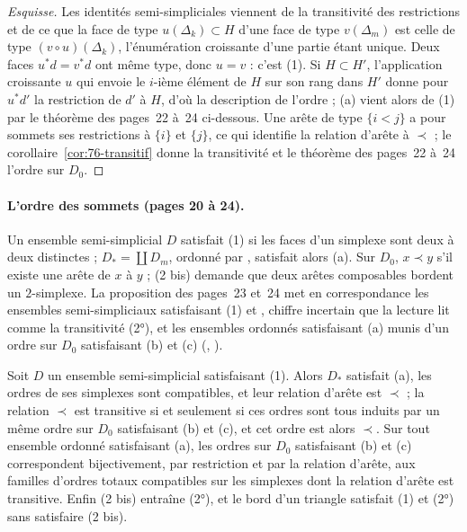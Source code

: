 \begin{proof}[Esquisse]
Les identités semi-simpliciales viennent de la transitivité des restrictions et de ce que la face de type $u(\Delta_k) \subset H$ d'une face de type $v(\Delta_m)$ est celle de type $(v \circ u)(\Delta_k)$, l'énumération croissante d'une partie étant unique. Deux faces $u^*d = v^*d$ ont même type, donc $u = v$ : c'est (1). Si $H \subset H'$, l'application croissante $u$ qui envoie le $i$-ième élément de $H$ sur son rang dans $H'$ donne pour $u^*d'$ la restriction de $d'$ à $H$, d'où la description de l'ordre ; (a) vient alors de (1) par le théorème des pages~22 à~24 ci-dessous. Une arête de type $\{i < j\}$ a pour sommets ses restrictions à $\{i\}$ et $\{j\}$, ce qui identifie la relation d'arête à $\prec$ ; le corollaire~\ref{cor:76-transitif} donne la transitivité et le théorème des pages~22 à~24 l'ordre sur $D_0$.
\end{proof}

\paragraph{L'ordre des sommets (pages 20 à 24).} Un ensemble semi-simplicial $D$ satisfait (1) si les faces d'un simplexe sont deux à deux distinctes ; $D_* = \coprod D_m$, ordonné par , satisfait alors (a). Sur $D_0$, $x \prec y$ s'il existe une arête de $x$ à $y$ ; (2 bis) demande que deux arêtes composables bordent un $2$-simplexe. La proposition des pages~23 et~24 met en correspondance les ensembles semi-simpliciaux satisfaisant (1) et , chiffre incertain que la lecture lit comme la transitivité (2°), et les ensembles ordonnés satisfaisant (a) munis d'un ordre sur $D_0$ satisfaisant (b) et (c) (, ).

\begin{encadre}
\begin{theoreme}
Soit $D$ un ensemble semi-simplicial satisfaisant (1). Alors $D_*$ satisfait (a), les ordres de ses simplexes sont compatibles, et leur relation d'arête est $\prec$ ; la relation $\prec$ est transitive si et seulement si ces ordres sont tous induits par un même ordre sur $D_0$ satisfaisant (b) et (c), et cet ordre est alors $\prec$. Sur tout ensemble ordonné satisfaisant (a), les ordres sur $D_0$ satisfaisant (b) et (c) correspondent bijectivement, par restriction et par la relation d'arête, aux familles d'ordres totaux compatibles sur les simplexes dont la relation d'arête est transitive. Enfin (2 bis) entraîne (2°), et le bord d'un triangle satisfait (1) et (2°) sans satisfaire (2 bis).
\end{theoreme}
\end{encadre}

